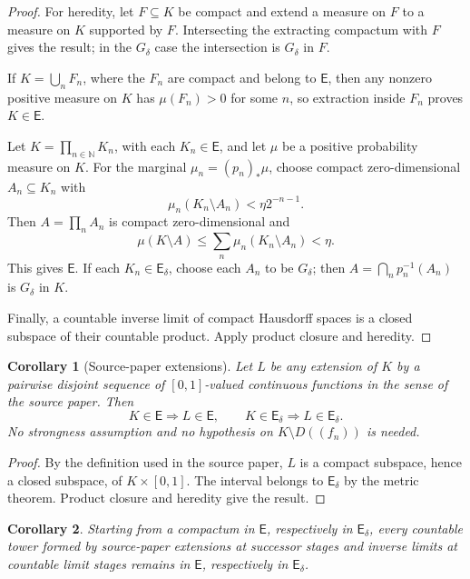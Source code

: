 \documentclass[11pt]{article}
\newtheorem{corollary}{Corollary}
\newcommand{\E}{\mathsf E}
\newcommand{\Ed}{\mathsf E_\delta}
\newcommand{\N}{\mathbb N}
\begin{document}
\begin{proof}
For heredity, let \(F\subseteq K\) be compact and extend a measure on \(F\) to
a measure on \(K\) supported by \(F\).  Intersecting the extracting compactum
with \(F\) gives the result; in the \(G_\delta\) case the intersection is
\(G_\delta\) in \(F\).

If \(K=\bigcup_n F_n\), where the \(F_n\) are compact and belong to \(\E\), then
any nonzero positive measure on \(K\) has \(\mu(F_n)>0\) for some \(n\), so
extraction inside \(F_n\) proves \(K\in\E\).

Let \(K=\prod_{n\in\N}K_n\), with each \(K_n\in\E\), and let \(\mu\) be a
positive probability measure on \(K\).  For the marginal
\(\mu_n=(p_n)_*\mu\), choose compact zero-dimensional \(A_n\subseteq K_n\) with
\[
  \mu_n(K_n\setminus A_n)<\eta 2^{-n-1}.
\]
Then \(A=\prod_n A_n\) is compact zero-dimensional and
\[
  \mu(K\setminus A)\le\sum_n\mu_n(K_n\setminus A_n)<\eta .
\]
This gives \(\E\).  If each \(K_n\in\Ed\), choose each \(A_n\) to be \(G_\delta\);
then \(A=\bigcap_n p_n^{-1}(A_n)\) is \(G_\delta\) in \(K\).

Finally, a countable inverse limit of compact Hausdorff spaces is a closed
subspace of their countable product.  Apply product closure and heredity.
\end{proof}

\begin{corollary}[Source-paper extensions]
Let \(L\) be any extension of \(K\) by a pairwise disjoint sequence of
\([0,1]\)-valued continuous functions in the sense of the source paper.  Then
\[
  K\in\E \Rightarrow L\in\E,\qquad K\in\Ed \Rightarrow L\in\Ed .
\]
No strongness assumption and no hypothesis on \(K\setminus D((f_n))\) is needed.
\end{corollary}

\begin{proof}
By the definition used in the source paper, \(L\) is a compact subspace, hence a
closed subspace, of \(K\times[0,1]\).  The interval belongs to \(\Ed\) by the
metric theorem.  Product closure and heredity give the result.
\end{proof}

\begin{corollary}
Starting from a compactum in \(\E\), respectively in \(\Ed\), every countable
tower formed by source-paper extensions at successor stages and inverse limits
at countable limit stages remains in \(\E\), respectively in \(\Ed\).
\end{corollary}
\end{document}
